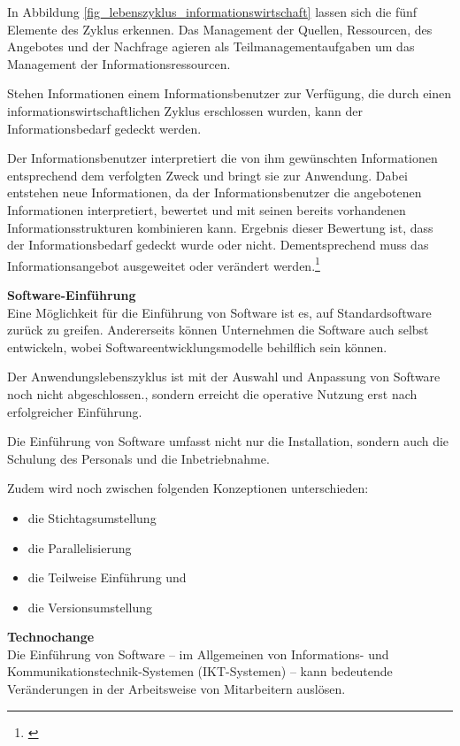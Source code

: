 In Abbildung \ref{fig_lebenszyklus_informationswirtschaft} lassen sich die fünf Elemente des Zyklus erkennen. Das Management der Quellen, Ressourcen, des Angebotes und der Nachfrage agieren als Teilmanagementaufgaben um das Management der Informationsressourcen.

Stehen Informationen einem Informationsbenutzer zur Verfügung, die durch einen informationswirtschaftlichen Zyklus erschlossen wurden, kann der Informationsbedarf gedeckt werden.

Der Informationsbenutzer interpretiert die von ihm gewünschten Informationen entsprechend dem verfolgten Zweck und bringt sie zur Anwendung.
Dabei entstehen neue Informationen, da der Informationsbenutzer die angebotenen Informationen interpretiert, bewertet und mit seinen bereits vorhandenen Informationsstrukturen kombinieren kann.
Ergebnis dieser Bewertung ist, dass der Informationsbedarf gedeckt wurde oder nicht. Dementsprechend muss das Informationsangebot ausgeweitet oder verändert werden.\footnote{\cite{krcmar_einfuhrung_2015}}

\textbf{Software-Einführung}\\
Eine Möglichkeit für die Einführung von Software ist es, auf Standardsoftware zurück zu greifen. Andererseits können Unternehmen die Software auch selbst entwickeln, wobei Softwareentwicklungsmodelle behilflich sein können.

Der Anwendungslebenszyklus ist mit der Auswahl und Anpassung von Software noch nicht abgeschlossen., sondern erreicht die operative Nutzung erst nach erfolgreicher Einführung.

Die Einführung von Software umfasst nicht nur die Installation, sondern auch die Schulung des Personals und die Inbetriebnahme.

Zudem wird noch zwischen folgenden Konzeptionen unterschieden: 
\begin{itemize}
	\item die Stichtagsumstellung
	\item die Parallelisierung
	\item die Teilweise Einführung und
	\item die Versionsumstellung
\end{itemize}

\textbf{Technochange}\\
Die Einführung von Software – im Allgemeinen von Informations- und Kommunikationstechnik-Systemen (IKT-Systemen) – kann bedeutende Veränderungen in der Arbeitsweise von Mitarbeitern auslösen. 


